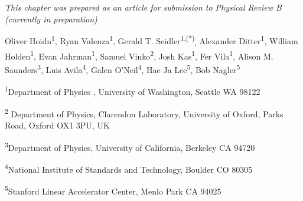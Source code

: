 
\emph{This chapter was prepared as an article for submission to Physical Review B (currently in preparation)}


\author[1]{aaaab}


{\centering
Oliver Hoidn\textsuperscript{1}, Ryan Valenza\textsuperscript{1}, Gerald
T. Seidler\textsuperscript{1,(*)}\textsubscript{,} Alexander
Ditter\textsuperscript{1}, William Holden\textsuperscript{1}, Evan
Jahrman\textsuperscript{1}, Samuel Vinko\textsuperscript{2}, Josh
Kas\textsuperscript{1}, Fer Vila\textsuperscript{1}, Alison M.
Saunders\textsuperscript{3}, Luis Avila\textsuperscript{4}, Galen
O'Neil\textsuperscript{4}, Hae Ja Lee\textsuperscript{5}, Bob
Nagler\textsuperscript{5}

\bigbreak

\textsuperscript{1}Department of Physics , University of Washington,
Seattle WA 98122

\textsuperscript{2} Department of Physics, Clarendon Laboratory, University of Oxford, Parks Road, Oxford OX1 3PU, UK

\textsuperscript{3}Department of Physics, University of California,
Berkeley CA 94720

\textsuperscript{4}National Institute of Standards and Technology,
Boulder CO 80305

\textsuperscript{5}Stanford Linear Accelerator Center, Menlo Park CA
94025

}

\bigbreak

